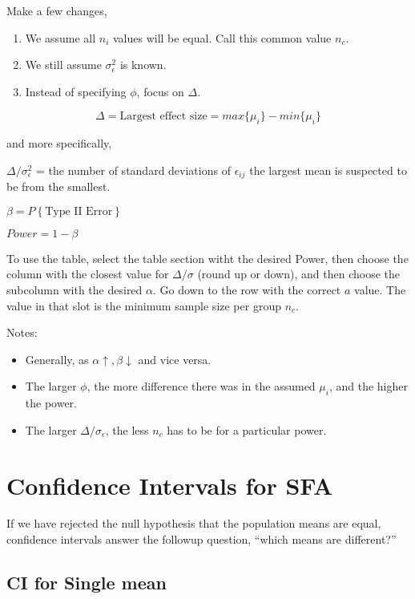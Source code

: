 \documentclass[10pt]{article}
\newcommand{\mean}[1]{\mu_{#1}}
\newcommand{\sigvar}[1]{\sigma^2_{#1}} %
\newcommand{\sigdev}[1]{\sigma_{#1}}
\newcommand{\err}[1]{\epsilon_{#1}}
\newcommand{\prob}[1]{P\left\{#1\right\}}
\begin{document}
\begin{multicols}{3}
    Make a few changes,

    \begin{enumerate}
        \item We assume all $n_i$ values will be equal. Call this common value $n_c$.
        \item We still assume $\sigvar{\epsilon}$ is known.
        \item Instead of specifying $\phi$, focus on $\Delta$.
    \end{enumerate}

    \begin{equation}
        \Delta = \text{Largest effect size} = max\{\mean{i}\} - min\{\mean{i}\}
    \end{equation}

    and more specifically,

    $\Delta/\sigvar{\epsilon}$ = the number of standard deviations of $\err{ij}$ the largest mean is suspected to be from the smallest.

    $\beta = \prob{\text{Type II Error}}$

    $Power = 1 - \beta$

    To use the table, select the table section witht the desired Power, then choose the column with the closest value for $\Delta/\sigma$ (round up or down), and then choose the subcolumn with the desired $\alpha$. Go down to the row with the correct $a$ value. The value in that slot is the minimum sample size per group $n_c$. 

    Notes:
    \begin{itemize}
        \item Generally, as $\alpha \uparrow, \beta \downarrow$ and vice versa.
        \item The larger $\phi$, the more difference there was in the assumed $\mean{i}$, and the higher the power.
        \item The larger $\Delta/\sigdev{\epsilon}$, the less $n_c$ has to be for a particular power.
    \end{itemize}

    \section{Confidence Intervals for SFA}

    If we have rejected the null hypothesis that the population means are equal, confidence intervals answer the followup question, ``which means are different?''

    \subsection{CI for Single mean}


\end{multicols}
\end{document}
